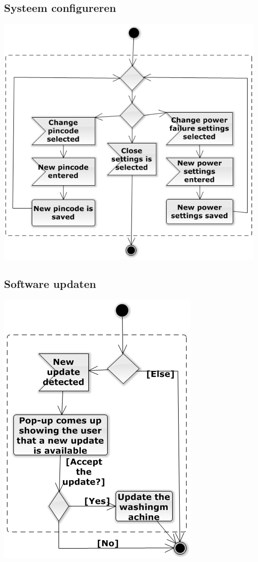 \subsection{Systeem configureren}
\includegraphics{configureActivity.png}

\subsection{Software updaten}
\includegraphics{updateActivity.png}


